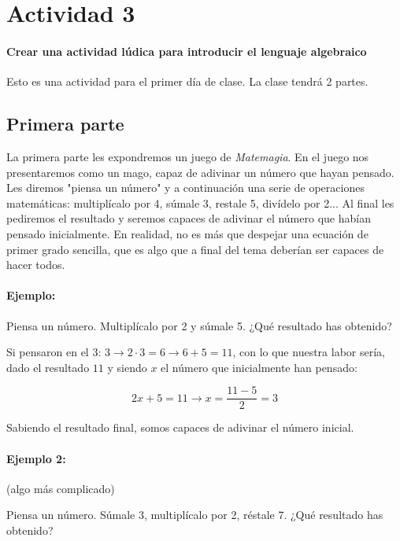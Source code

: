 

\section{Actividad 3}

\paragraph{Crear una actividad lúdica para introducir el lenguaje algebraico}

Esto es una actividad para el primer día de clase. La clase tendrá 2 partes.

\subsection{Primera parte}


La primera parte les expondremos un juego de \textit{Matemagia}.
%
En el juego nos presentaremos como un mago, capaz de adivinar un número que hayan pensado.
%
Les diremos "piensa un número" y a continuación una serie de operaciones matemáticas: multiplícalo por 4, súmale 3, restale 5, divídelo por 2...
%
Al final les pediremos el resultado y seremos capaces de adivinar el número que habían pensado inicialmente.
%
En realidad, no es más que despejar una ecuación de primer grado sencilla, que es algo que a final del tema deberían ser capaces de hacer todos.



\paragraph{Ejemplo:}

Piensa un número. Multiplícalo por 2 y súmale 5. ¿Qué resultado has obtenido?

Si pensaron en el 3: $ 3\to 2·3 = 6\to 6+5 = 11 $, con lo que nuestra labor sería, dado el resultado $11$ y siendo $x$ el número que inicialmente han pensado:

\[
	2x+5 = 11 \to x = \frac{11-5}{2} = 3
\]

Sabiendo el resultado final, somos capaces de adivinar el número inicial.

\paragraph{Ejemplo 2:}(algo más complicado)

Piensa un número. Súmale 3, multiplícalo por 2, réstale 7. ¿Qué resultado has obtenido?

